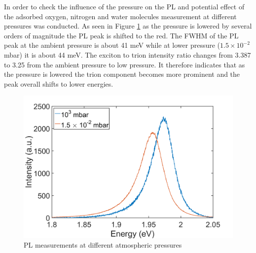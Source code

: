 In order to check the influence of the pressure on the PL and potential effect of the adsorbed oxygen, nitrogen and water molecules measurement at different pressures was conducted. As seen in Figure \ref{fig:LowTPLPressureDifference} as the pressure is lowered by several orders of magnitude the PL peak is shifted to the red. The FWHM of the PL peak at the ambient pressure is about 41 meV while at lower pressure ($1.5 \times 10^{-2}$ mbar) it is about 44 meV. The exciton to trion intensity ratio changes from 3.387 to 3.25 from the ambient pressure to low pressure. It therefore indicates that as the pressure is lowered the trion component becomes more prominent and the peak overall shifts to lower energies. 

\begin{figure}[!ht]
	\begin{center}
		\includegraphics[scale=0.4]{LowT/LowTPLPressureDifference.png}
		\caption{PL measurements at different atmospheric pressures}
		\label{fig:LowTPLPressureDifference}
	\end{center}
\end{figure}

